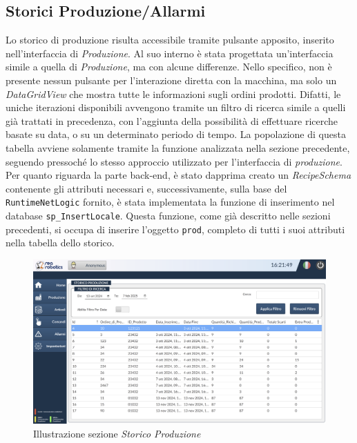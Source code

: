 \subsection{Storici Produzione/Allarmi}
Lo storico di produzione risulta accessibile tramite pulsante apposito, inserito nell'interfaccia di \textit{Produzione}. Al suo interno è stata progettata un'interfaccia simile a quella di \textit{Produzione}, ma con alcune differenze. Nello specifico, non è presente nessun pulsante per l'interazione diretta con la macchina, ma solo un \textit{DataGridView} che mostra tutte le informazioni sugli ordini prodotti. Difatti, le uniche iterazioni disponibili avvengono tramite un filtro di ricerca simile a quelli già trattati in precedenza, con l'aggiunta della possibilità di effettuare ricerche basate su data, o su un determinato periodo di tempo. La popolazione di questa tabella avviene solamente tramite la funzione analizzata nella sezione precedente, seguendo pressoché lo stesso approccio utilizzato per l'interfaccia di \textit{produzione}. Per quanto riguarda la parte back-end, è stato dapprima creato un \textit{RecipeSchema} contenente gli attributi necessari e, successivamente, sulla base del \verb|RuntimeNetLogic| fornito, è stata implementata la funzione di inserimento nel database \verb|sp_InsertLocale|. Questa funzione, come già descritto nelle sezioni precedenti, si occupa di inserire l'oggetto \verb|prod|, completo di tutti i suoi attributi nella tabella dello storico.

\begin{figure} 
    \centering
    \includegraphics[width=1\linewidth]{Immagini/StoricoProduzione.png}
    \caption{Illustrazione sezione \textit{Storico Produzione}}
    \label{fig:StoricoProduzione.png}
\end{figure}

